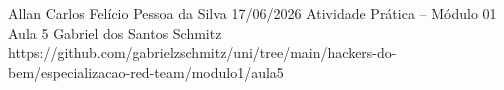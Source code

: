 \documentclass{article}
\begin{document}
{Allan Carlos Felício Pessoa da Silva}
{17/06/2026}
{Atividade Prática -- Módulo 01}
{Aula 5}
{Gabriel dos Santos Schmitz}
{https://github.com/gabrielzschmitz/uni/tree/main/hackers-do-bem/especializacao-red-team/modulo1/aula5}





\newpage
\printbibliography[title=Referências]
\end{document}

